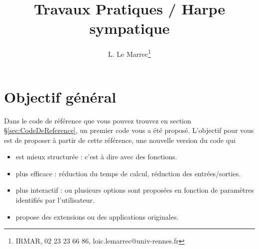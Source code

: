 \documentclass[a4paper,10pt]{article}
\begin{document}
\thispagestyle{empty}
%
\title{Travaux Pratiques / Harpe sympatique}

\author{L. Le Marrec\footnote{IRMAR, 02 23 23 66 86, loic.lemarrec@univ-rennes.fr}}

\maketitle \vspace{-0.7cm}




\section{Objectif général}
Dans le code de référence que vous pouvez trouvez en section \S\ref{sec:CodeDeReference}, un premier code vous a été proposé. L'objectif pour vous est de proposer à partir de cette référence, une nouvelle version du code qui
\begin{itemize}
    \item est mieux structurée : c'est à dire avec des fonctions.
    \item plus efficace : réduction du temps de calcul, réduction des entrées/sorties.
    \item plus interactif : ou plusieurs options sont proposées en fonction de paramètres identifiés par l'utilisateur.
    \item propose des extensions ou des applications originales.
\end{itemize}
\end{document}
